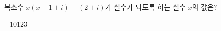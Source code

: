 복소수 $x(x-1+i)-(2+i)$가 실수가 되도록 하는 실수 $x$의 값은?
\begin{choices32}{$-1$}{$0$}{$1$}{$2$}{$3$}\end{choices32}
